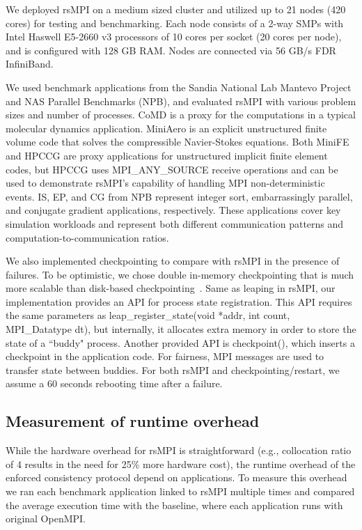 We deployed rsMPI on a medium sized cluster and utilized up to 21 nodes (420 cores) for testing and benchmarking. Each node consists of a 2-way SMPs with Intel Haswell E5-2660 v3 processors of 10 cores per socket (20 cores per node), and is configured with 128 GB RAM. Nodes are connected via 56 GB/s FDR InfiniBand. %

We used benchmark applications from the Sandia National Lab Mantevo Project and NAS Parallel Benchmarks (NPB), and evaluated rsMPI with various problem sizes and number of processes. CoMD is a proxy for the computations in a typical molecular dynamics application. MiniAero is an explicit unstructured finite volume code that solves the compressible Navier-Stokes equations. Both MiniFE and HPCCG are proxy applications for unstructured implicit finite element codes, but HPCCG uses MPI\_ANY\_SOURCE receive operations and can be used to demonstrate rsMPI's capability of handling MPI non-deterministic events. IS, EP, and CG from NPB represent integer sort, embarrassingly parallel, and conjugate gradient applications, respectively. These applications cover key simulation workloads and represent both different communication patterns and computation-to-communication ratios.

We also implemented checkpointing to compare with rsMPI in the presence of failures. To be optimistic, we chose double in-memory checkpointing that is much more scalable than disk-based checkpointing~\cite{zheng2004ftc}. Same as leaping in rsMPI, our implementation provides an API for process state registration. This API requires the same parameters as leap\_register\_state(void *addr, int count, MPI\_Datatype dt), but internally, it allocates extra memory in order to store the state of a ``buddy" process. Another provided API is checkpoint(), which inserts a checkpoint in the application code. For fairness, MPI messages are used to transfer state between buddies.  
For both rsMPI and checkpointing/restart, we assume a 60 seconds rebooting time after a failure. %

\subsection{Measurement of runtime overhead}
\label{sec:runtime_overhead}
While the hardware overhead for rsMPI is straightforward (e.g., collocation ratio of 4 results in the need for 25\% more hardware cost), the runtime overhead of the enforced consistency protocol depend on applications. To measure this overhead we ran each benchmark application linked to rsMPI multiple times and compared the average execution time with the baseline, where each application runs with original OpenMPI.

